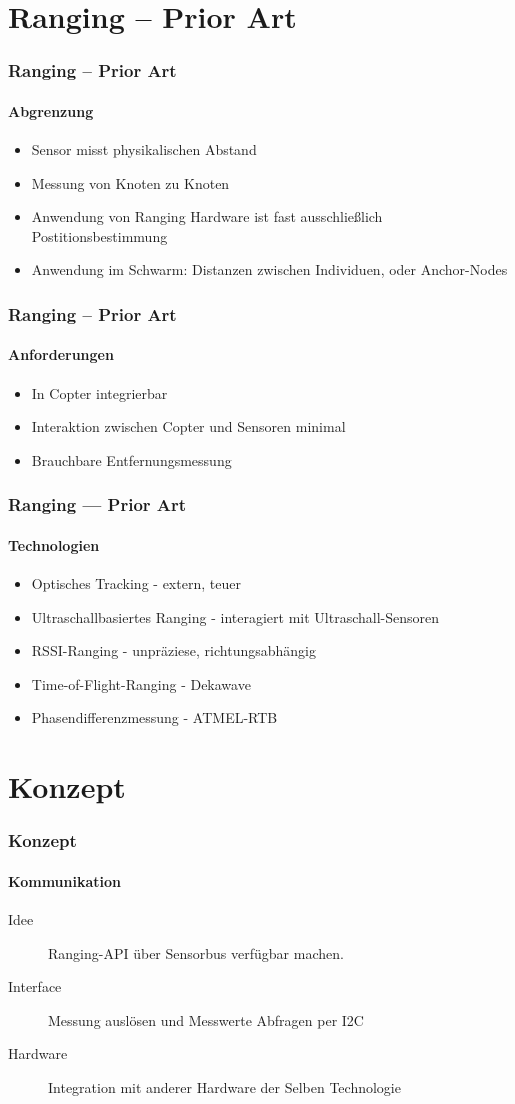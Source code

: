 \documentclass{beamer}
\begin{document}
\section{Ranging – Prior Art}
\begin{frame}
	\frametitle{Ranging – Prior Art}
	\framesubtitle{Abgrenzung}
	\begin{itemize}
		\item Sensor misst physikalischen Abstand
		\item Messung von Knoten zu Knoten
		\item Anwendung von Ranging Hardware ist fast ausschließlich Postitionsbestimmung
		\item Anwendung im Schwarm: Distanzen zwischen Individuen, oder Anchor-Nodes
	\end{itemize}
\end{frame}

\begin{frame}
	\frametitle{Ranging – Prior Art}
	\framesubtitle{Anforderungen}
	\begin{itemize}
		\item In Copter integrierbar 
		\item Interaktion zwischen Copter und Sensoren minimal
		\item Brauchbare Entfernungsmessung
	\end{itemize}
\end{frame}

\begin{frame}
	\frametitle{Ranging — Prior Art}
	\framesubtitle{Technologien}
	\begin{itemize}
		\item Optisches Tracking - extern, teuer
		\item Ultraschallbasiertes Ranging - interagiert mit Ultraschall-Sensoren
		\item RSSI-Ranging - unpräziese, richtungsabhängig
	\end{itemize}
	\begin{itemize}
		\item Time-of-Flight-Ranging - Dekawave
		\item Phasendifferenzmessung - ATMEL-RTB
	\end{itemize}
\end{frame}

\section{Konzept}
\begin{frame}
	\frametitle{Konzept}
	\framesubtitle{Kommunikation}
	
\begin{description}
	\item[ Idee ] Ranging-API über Sensorbus verfügbar machen.
	\item[ Interface ] Messung auslösen und Messwerte Abfragen per I2C
	\item[ Hardware ] Integration mit anderer Hardware der Selben Technologie
\end{description}
\end{frame}
\end{document}
